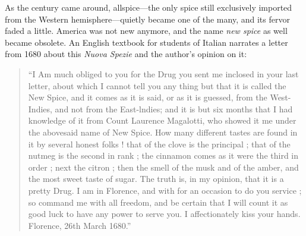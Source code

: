 As the  century came around, allspice---the only spice still exclusively imported from the Western hemisphere---quietly became one of the many, and its fervor faded a little. America was not new anymore, and the name \textit{new spice} as well became obsolete. An English textbook for students of Italian narrates a letter from 1680 about this \textit{Nuova Spezie} and the author's opinion on it:

\begin{quote}
``I Am much obliged to you for the Drug you sent me inclosed in your last letter, about which I cannot tell you any thing but that it is called the New Spice, and it comes as it is said, or as it is guessed, from the West-Indies, and not from the East-lndies; and it is but six months that I had knowledge of it from Count Laurence Magalotti, who showed it me under the abovesaid name of New Spice. How many different tastes are found in it by several honest folks ! that of the clove is the principal ; that of the nutmeg is the second in rank ; the cinnamon comes as it were the third in order ; next the citron ; then the smell of the musk and of the amber, and the most sweet taste of sugar. The truth is, in my opinion, that it is a pretty Drug. I am in Florence, and with for an occasion to do you service ; so command me with all freedom, and be certain that I will count it as good luck to have any power to serve you. I affectionately kiss your hands. Florence, 26th March 1680.'' \autocite[5]{baretti_introduction_1755}
\end{quote}


